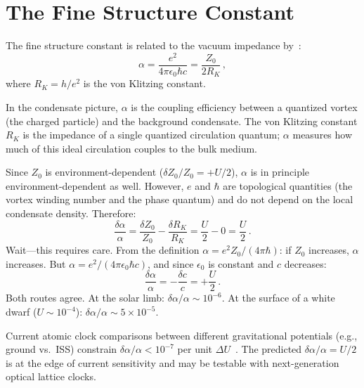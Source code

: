 \documentclass[12pt, a4paper]{article}
\begin{document}
\section{The Fine Structure Constant}
\label{sec:alpha}

The fine structure constant is related to the vacuum
impedance by~\cite{jackson_1999}:
\begin{equation}
    \alpha = \frac{e^2}{4\pi\epsilon_0\hbar c}
    = \frac{Z_0}{2R_K}\,,
\label{eq:alpha_Z}
\end{equation}
where $R_K = h/e^2$ is the von Klitzing constant.

In the condensate picture, $\alpha$ is the coupling
efficiency between a quantized vortex (the charged
particle) and the background condensate. The von
Klitzing constant $R_K$ is the impedance of a single
quantized circulation quantum; $\alpha$ measures how
much of this ideal circulation couples to the bulk
medium.

Since $Z_0$ is environment-dependent
($\delta Z_0/Z_0 = +U/2$), $\alpha$ is in principle
environment-dependent as well. However, $e$ and
$\hbar$ are topological quantities (the vortex
winding number and the phase quantum) and do not
depend on the local condensate density. Therefore:
\begin{equation}
    \frac{\delta\alpha}{\alpha}
    = \frac{\delta Z_0}{Z_0}
    - \frac{\delta R_K}{R_K}
    = \frac{U}{2} - 0 = \frac{U}{2}\,.
\label{eq:dalpha}
\end{equation}
Wait---this requires care. From the definition
$\alpha = e^2 Z_0/(4\pi\hbar)$:
if $Z_0$ increases, $\alpha$ increases. But
$\alpha = e^2/(4\pi\epsilon_0\hbar c)$, and since
$\epsilon_0$ is constant and $c$ decreases:
\begin{equation}
    \frac{\delta\alpha}{\alpha}
    = -\frac{\delta c}{c}
    = +\frac{U}{2}\,.
\label{eq:dalpha2}
\end{equation}
Both routes agree. At the solar limb:
$\delta\alpha/\alpha \sim 10^{-6}$. At the surface
of a white dwarf ($U \sim 10^{-4}$):
$\delta\alpha/\alpha \sim 5 \times 10^{-5}$.

Current atomic clock comparisons between different
gravitational potentials (e.g., ground vs.\ ISS)
constrain $\delta\alpha/\alpha < 10^{-7}$ per unit
$\Delta U$~\cite{safronova_2018}. The predicted
$\delta\alpha/\alpha = U/2$ is at the edge of
current sensitivity and may be testable with
next-generation optical lattice clocks.
\end{document}
